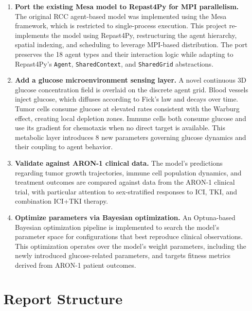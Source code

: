 \begin{enumerate}
    \item \textbf{Port the existing Mesa model to Repast4Py for MPI parallelism.} The original RCC agent-based model was implemented using the Mesa framework, which is restricted to single-process execution. This project re-implements the model using Repast4Py, restructuring the agent hierarchy, spatial indexing, and scheduling to leverage MPI-based distribution. The port preserves the 18 agent types and their interaction logic while adapting to Repast4Py's \texttt{Agent}, \texttt{SharedContext}, and \texttt{SharedGrid} abstractions.

    \item \textbf{Add a glucose microenvironment sensing layer.} A novel continuous 3D glucose concentration field is overlaid on the discrete agent grid. Blood vessels inject glucose, which diffuses according to Fick's law and decays over time. Tumor cells consume glucose at elevated rates consistent with the Warburg effect, creating local depletion zones. Immune cells both consume glucose and use its gradient for chemotaxis when no direct target is available. This metabolic layer introduces 8 new parameters governing glucose dynamics and their coupling to agent behavior.

    \item \textbf{Validate against ARON-1 clinical data.} The model's predictions regarding tumor growth trajectories, immune cell population dynamics, and treatment outcomes are compared against data from the ARON-1 clinical trial, with particular attention to sex-stratified responses to ICI, TKI, and combination ICI+TKI therapy.

    \item \textbf{Optimize parameters via Bayesian optimization.} An Optuna-based \cite{optuna} Bayesian optimization pipeline is implemented to search the model's parameter space for configurations that best reproduce clinical observations. This optimization operates over the model's weight parameters, including the newly introduced glucose-related parameters, and targets fitness metrics derived from ARON-1 patient outcomes.
\end{enumerate}

\section{Report Structure}
\label{sec:intro_structure}

